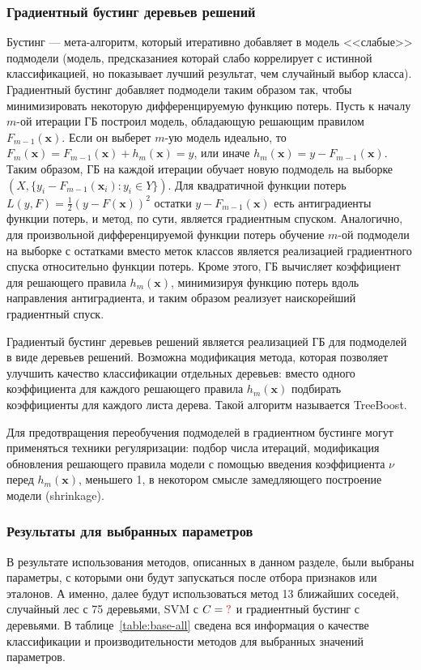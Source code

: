 \subsubsection{Градиентный бустинг деревьев решений}
Бустинг --- мета-алгоритм, который итеративно добавляет в модель <<слабые>> подмодели (модель, предсказаниея которай слабо коррелирует с истинной классификацией, но показывает лучший результат, чем случайный выбор класса). Градиентный бустинг \cite{friedman} добавляет подмодели таким образом так, чтобы минимизировать некоторую дифференцируемую функцию потерь. Пусть к началу \(m\)-ой итерации ГБ построил модель, обладающую решающим правилом \(F_{m-1}(\mathbf{x})\). Если он выберет \(m\)-ую модель идеально, то \(F_{m}(\mathbf{x})=F_{m-1}(\mathbf{x}) + h_m(\mathbf{x})=y\), или иначе \(h_m(\mathbf{x})=y-F_{m-1}(\mathbf{x})\). Таким образом, ГБ на каждой итерации обучает новую подмодель на выборке \(\left(X, \{y_i-F_{m-1}(\mathbf{x}_i):y_i\in Y\}\right)\). Для квадратичной функции потерь \(L\left(y, F\right)=\frac12 \left(y-F(\mathbf{x})\right)^2\) остатки \(y-F_{m-1}(\mathbf{x})\) есть антиградиенты функции потерь, и метод, по сути, является градиентным спуском. Аналогично, для произвольной дифференцируемой функции потерь обучение \(m\)-ой подмодели на выборке с остатками вместо меток классов является реализацией градиентного спуска относительно функции потерь. Кроме этого, ГБ вычисляет коэффициент для решающего правила \(h_m(\mathbf{x})\), минимизируя функцию потерь вдоль направления антиградиента, и таким образом реализует наискорейший градиентный спуск.

Градиентый бустинг деревьев решений является реализацией ГБ для подмоделей в виде деревьев решений. Возможна модификация метода, которая позволяет улучшить качество классификации отдельных деревьев: вместо одного коэффициента для каждого решающего правила \(h_m(\mathbf{x})\) подбирать коэффициенты для каждого листа дерева. Такой алгоритм называется TreeBoost.

Для предотвращения переобучения подмоделей в градиентном бустинге могут применяться техники регуляризации: подбор числа итераций, модификация обновления решающего правила модели с помощью введения коэффициента \(\nu\) перед \(h_m(\mathbf{x})\), меньшего 1, в некотором смысле замедляющего построение модели (shrinkage).


\subsubsection{Результаты для выбранных параметров}
В результате использования методов, описанных в данном разделе, были выбраны параметры, с которыми они будут запускаться после отбора признаков или эталонов.  А именно, далее будут использоваться метод 13 ближайших соседей, случайный лес с 75 деревьями, SVM с \(C=\textcolor{red}{?}\) и градиентный бустинг с  деревьями. В таблице~\ref{table:base-all} сведена вся информация о качестве классификации и производительности методов для выбранных значений параметров.

